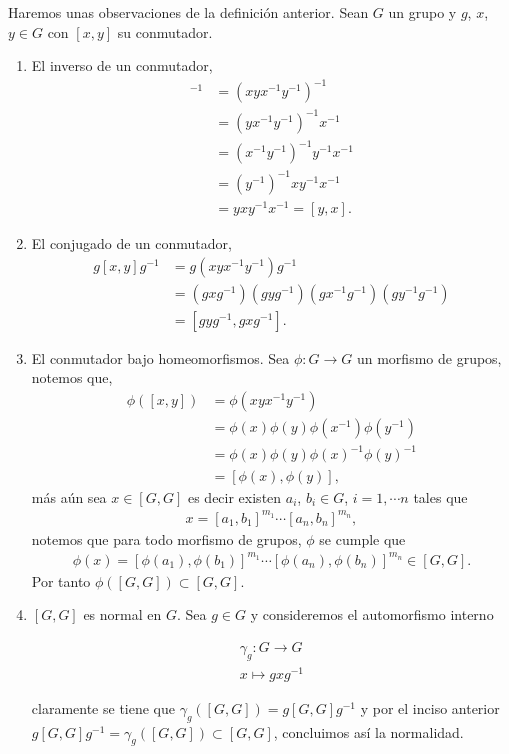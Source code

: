\begin{ob}\label{ob:pr_de_los_conmutadores}
Haremos unas observaciones de la definición anterior. Sean $G$ un grupo y $g$, $x$, $y \in G$ con $[x,y]$ su conmutador.

\begin{enumerate}
	\item El inverso de un conmutador,
	\begin{align*}
	[x,y]^{-1} & =(xyx^{-1}y^{-1})^{-1} \\
	& = (yx^{-1}y^{-1})^{-1}x^{-1} \\
	& = (x^{-1}y^{-1})^{-1}y^{-1}x^{-1} \\
	& = (y^{-1})^{-1}xy^{-1}x^{-1} \\
	& = yxy^{-1}x^{-1} = [y,x] .
	\end{align*}
	\item El conjugado de un conmutador, 
	\begin{align*}
	g[x,y]g^{-1} & = g(xyx^{-1}y^{-1})g^{-1} \\
	& = (gxg^{-1})(gyg^{-1})(gx^{-1}g^{-1})(gy^{-1}g^{-1}) \\
	& =  [gyg^{-1},gxg^{-1}].
	\end{align*}
	
	\item El conmutador bajo homeomorfismos. Sea $\phi:G \to G$ un morfismo de grupos, notemos que,
	\begin{align*}
	\phi([x,y]) & = \phi(xyx^{-1}y^{-1})\\
	& = \phi(x)\phi(y)\phi(x^{-1})\phi(y^{-1}) \\
	& = \phi(x)\phi(y)\phi(x)^{-1}\phi(y)^{-1} \\
	& =  [\phi(x),\phi(y)],     
	\end{align*}
	más aún sea $x \in [G,G]$ es decir existen $a_i$, $b_i \in G$, $i=1, \cdots n$ tales que
	\begin{align*}
	x=[a_1,b_1]^{m_1} \cdots[a_n,b_n]^{m_n},
	\end{align*}
	notemos que para todo morfismo de grupos, $\phi$ se cumple que
	\begin{align*}
	\phi(x)=[\phi(a_1),\phi(b_1)]^{m_1} \cdots[\phi(a_n),\phi(b_n)]^{m_n} \in [G,G].
	\end{align*}
	 Por tanto $\phi([G,G]) \subset [G,G]$.
	\item $[G,G]$ es normal en $G$. Sea $g \in G$ y consideremos el automorfismo interno 
	
	\begin{align*}
	\gamma_g:G \to G \\
	x \mapsto gxg^{-1}
	\end{align*}	 
	
	claramente se tiene que $\gamma_g([G,G])=g[G,G]g^{-1}$ y por el inciso anterior $g[G,G]g^{-1}=\gamma_g([G,G]) \subset [G,G]$, concluimos así la normalidad.
\end{enumerate}
\end{ob}


